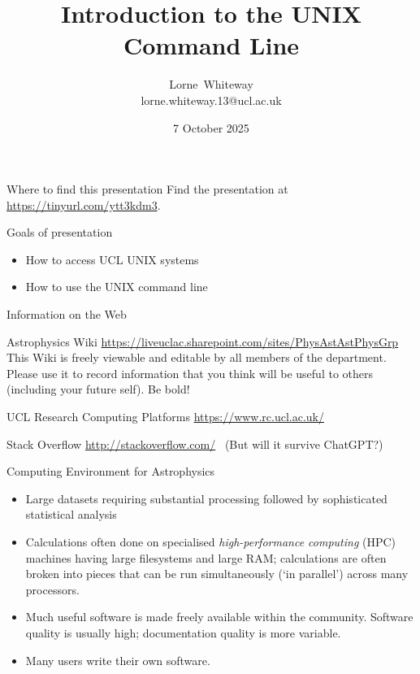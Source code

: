 \documentclass[dvipsnames]{beamer}
\title{Introduction to the UNIX Command Line}
\author{Lorne~Whiteway \\ lorne.whiteway.13@ucl.ac.uk}
\institute{Astrophysics Group\\  Department of Physics and Astronomy\\  University College London}
\date{7 October 2025}
\begin{document}
\frame{\titlepage}

\begin{frame}{Where to find this presentation}
    Find the presentation at \alert{\url{https://tinyurl.com/ytt3kdm3}}.\\
\end{frame}


\begin{frame}{Goals of presentation}
  \begin{itemize}
    \item How to access UCL UNIX systems
    \item How to use the UNIX command line
  \end{itemize}
\end{frame}


\begin{frame}{Information on the Web}
  \begin{block}{Astrophysics Wiki}
    {\small{\url{https://liveuclac.sharepoint.com/sites/PhysAstAstPhysGrp}}}
    This Wiki is freely viewable and editable by all members of the department. Please use it to record information that you think will be useful to others (including your future self). Be bold!
  \end{block}
  \begin{block}{UCL Research Computing Platforms}
    \url{https://www.rc.ucl.ac.uk/}
  \end{block}
  \begin{block}{Stack Overflow}
    \url{http://stackoverflow.com/}  \ (But will it survive ChatGPT?)
  \end{block}
\end{frame}


\begin{frame}{Computing Environment for Astrophysics}
  \begin{itemize}
  \item Large datasets requiring substantial processing followed by sophisticated statistical analysis
  \item Calculations often done on specialised \textit{high-performance computing} (HPC) machines having large filesystems and large RAM; calculations are often broken into pieces that can be run simultaneously (`in parallel') across many processors.
  \item Much useful software is made freely available within the community. Software quality is usually high; documentation quality is more variable.
  \item Many users write their own software.
  \end{itemize}
\end{frame}
\end{document}
